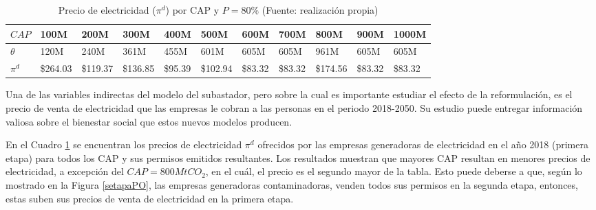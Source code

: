 \begin{table}[H]
\begin{footnotesize}
    \centering
    \begin{tabular}{|l|l|l|l|l|l|l|l|l|l|l|}
    \hline
        $CAP$ & 100M & 200M & 300M & 400M & 500M & 600M & 700M & 800M & 900M & 1000M \\ \hline
        $\theta$  & 120M & 240M & 361M & 455M & 601M & 605M & 605M & 961M & 605M & 605M \\ \hline
        $\pi^d$  &  \$264.03   &  \$119.37   &  \$136.85   &  \$95.39   &  \$102.94   &  \$83.32   &  \$83.32   &  \$174.56   &  \$83.32   &  \$83.32   \\ \hline
    \end{tabular}
    \caption{{\footnotesize Precio de electricidad ($\pi^d$) por CAP y $P=80\%$ (Fuente: realización propia)}}
    \label{POpidporcap}
\end{footnotesize}
\end{table}

Una de las variables indirectas del modelo del subastador, pero sobre la cual es importante estudiar el efecto de la reformulación, es el precio de venta de electricidad que las empresas le cobran a las personas en el periodo 2018-2050. Su estudio puede entregar información valiosa sobre el bienestar social que estos nuevos modelos producen.
\vspace{2.5mm}

En el Cuadro \ref{POpidporcap} se encuentran los precios de electricidad $\pi^d$ ofrecidos por las empresas generadoras de electricidad en el año 2018 (primera etapa) para todos los CAP y sus permisos emitidos resultantes. Los resultados muestran que mayores CAP resultan en menores precios de electricidad, a excepción del $CAP= 800MtCO_2$, en el cuál, el precio es el segundo mayor de la tabla. Esto puede deberse a que, según lo mostrado en la Figura \ref{setapaPO}, las empresas generadoras contaminadoras, venden todos sus permisos en la segunda etapa, entonces, estas suben sus precios de venta de electricidad en la primera etapa.
\vspace{2.5mm}

